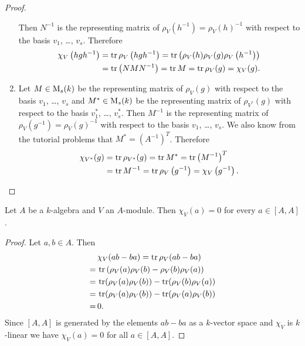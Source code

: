 \begin{proof}
\begin{enumerate}[label=\emph{\alph*)},leftmargin=*]
      Then $N^{-1}$ is the representing matrix of $\rho_V(h^{-1}) = \rho_V(h)^{-1}$ with respect to the basis $v_1$, \dots, $v_s$.
      Therefore
      \begin{align*}
            \chi_V\left( hgh^{-1} \right)
        &=  \operatorname{tr} \rho_V\left( hgh^{-1} \right)
         =  \operatorname{tr}\left( \rho_V(h) \rho_V(g) \rho_V\left( h^{-1} \right) \right) \\
        &=  \operatorname{tr}\left( NMN^{-1} \right)
         =  \operatorname{tr} M
         =  \operatorname{tr} \rho_V(g)
         =  \chi_V(g).
      \end{align*}
    \item
      Let $M \in \operatorname{M}_s(k)$ be the representing matrix of $\rho_V(g)$ with respect to the basis $v_1$, \dots, $v_s$ and $M^* \in \operatorname{M}_s(k)$ be the representing matrix of $\rho_{V^*}(g)$ with respect to the basis $v_1^*$, \dots, $v_s^*$.
      Then $M^{-1}$ is the representing matrix of $\rho_V(g^{-1}) = \rho_V(g)^{-1}$ with respect to the basis $v_1$, \dots, $v_s$.
      We also know from the tutorial problems that $M^* = \left(A^{-1}\right)^T$.
      Therefore
      \begin{align*}
            \chi_{V^*}(g)
        &=  \operatorname{tr} \rho_{V^*}(g)
         =  \operatorname{tr} M^*
         =  \operatorname{tr} \left(M^{-1}\right)^T \\
        &=  \operatorname{tr} M^{-1}
         =  \operatorname{tr} \rho_V\left( g^{-1} \right)
         =  \chi_V\left( g^{-1} \right).
        \qedhere
      \end{align*}
  \end{enumerate}
\end{proof}


\begin{lem}
  Let $A$ be a $k$-algebra and $V$ an $A$-module.
  Then $\chi_V(a) = 0$ for every $a \in [A,A]$.
\end{lem}
\begin{proof}
  Let $a, b \in A$.
  Then
  \begin{align*}
     &\,  \chi_V(ab - ba)
    =     \operatorname{tr} \rho_V(ab - ba) \\
    =&\,  \operatorname{tr} \left(
                \rho_V(a) \rho_V(b) - \rho_V(b) \rho_V(a)
              \right) \\
    =&\,  \operatorname{tr}(\rho_V(a)\rho_V(b)) - \operatorname{tr}(\rho_V(b)\rho_V(a)) \\
    =&\,  \operatorname{tr}(\rho_V(a)\rho_V(b)) - \operatorname{tr}(\rho_V(a)\rho_V(b)) \\
    =&\,  0.
  \end{align*}
  Since $[A,A]$ is generated by the elements $ab - ba$ as a $k$-vector space and $\chi_V$ is $k$-linear we have $\chi_V(a) = 0$ for all $a \in [A,A]$.
\end{proof}


